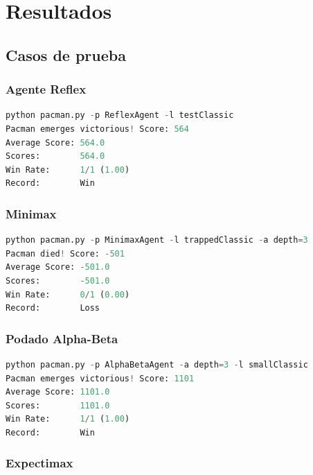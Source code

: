 \documentclass{report}
\begin{document}
    \chapter{Resultados}
      \section{Casos de prueba}
        \subsection{Agente Reflex}
            \begin{lstlisting}[language=Python, caption=Resultados del agente Reflex]
python pacman.py -p ReflexAgent -l testClassic
Pacman emerges victorious! Score: 564
Average Score: 564.0
Scores:        564.0
Win Rate:      1/1 (1.00)
Record:        Win
            \end{lstlisting}
        \clearpage\subsection{Minimax}
            \begin{lstlisting}[language=Python, caption=Resultados del agente Minimax]
python pacman.py -p MinimaxAgent -l trappedClassic -a depth=3
Pacman died! Score: -501
Average Score: -501.0
Scores:        -501.0
Win Rate:      0/1 (0.00)
Record:        Loss
            \end{lstlisting}
        \clearpage\subsection{Podado Alpha-Beta}
            \begin{lstlisting}[language=Python, caption=Resultados del agente Alpha-Beta]
python pacman.py -p AlphaBetaAgent -a depth=3 -l smallClassic
Pacman emerges victorious! Score: 1101
Average Score: 1101.0
Scores:        1101.0
Win Rate:      1/1 (1.00)
Record:        Win
            \end{lstlisting}
        \clearpage\subsection{Expectimax}
\end{document}
